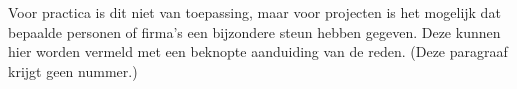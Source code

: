 Voor practica is dit niet van toepassing, maar voor projecten is het mogelijk dat bepaalde personen of firma’s een bijzondere steun hebben gegeven. 
Deze kunnen hier worden vermeld met een beknopte aanduiding van de reden. (Deze paragraaf krijgt geen nummer.)